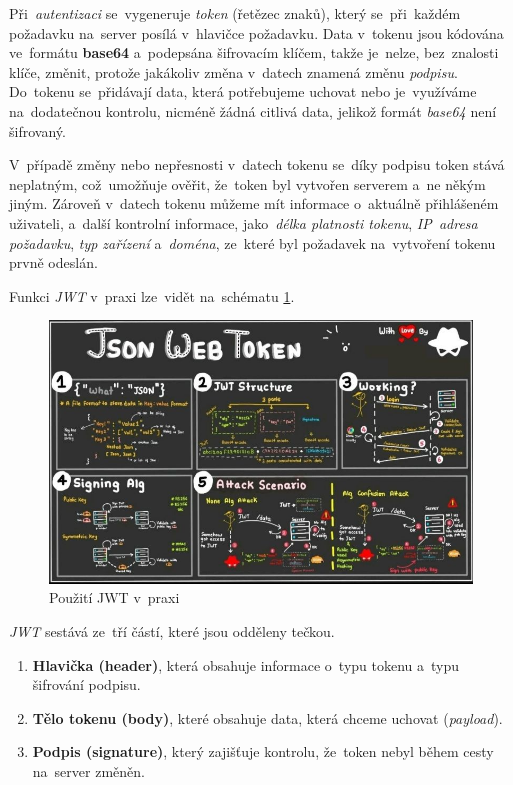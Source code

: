 \documentclass[11pt,a4paper]{report}
\begin{document}
                Při~\emph{autentizaci} se~vygeneruje \emph{token} (řetězec znaků), který se~při~každém požadavku na~server posílá v~hlavičce požadavku. Data v~tokenu jsou kódována ve~formátu \textbf{base64} a~podepsána šifrovacím klíčem, takže je~nelze, bez~znalosti klíče, změnit, protože jakákoliv změna v~datech znamená změnu \emph{podpisu}. Do~tokenu se~přidávají data, která potřebujeme uchovat nebo je~využíváme na~dodatečnou kontrolu, nicméně žádná citlivá data, jelikož formát \emph{base64} není šifrovaný. 
                
                V~případě změny nebo nepřesnosti v~datech tokenu se~díky podpisu token stává neplatným, což~umožňuje ověřit, že~token byl vytvořen serverem a~ne někým jiným. Zároveň v~datech tokenu můžeme mít informace o~aktuálně přihlášeném uživateli, a~další kontrolní informace, jako~\emph{délka platnosti tokenu}, \emph{IP~adresa požadavku}, \emph{typ zařízení} a~\emph{doména}, ze~které byl požadavek na~vytvoření tokenu prvně odeslán.

                Funkci \emph{JWT} v~praxi lze~vidět na~schématu \ref{model-jwt}.

                \begin{figure}
                    \centering
                    \includegraphics[width=.8\linewidth]{img/jwt.jpg}
                    \caption{Použití JWT v~praxi}
                    \label{model-jwt}
                \end{figure}

                \emph{JWT} sestává ze~tří částí, které jsou odděleny tečkou.
                
                \begin{enumerate}
                    \item \textbf{Hlavička (header)}, která obsahuje informace o~typu tokenu a~typu šifrování podpisu.
                    \item \textbf{Tělo tokenu (body)}, které obsahuje data, která chceme uchovat (\emph{payload}).
                    \item \textbf{Podpis (signature)}, který zajišťuje kontrolu, že~token nebyl během cesty na~server změněn.
                \end{enumerate}
\end{document}
